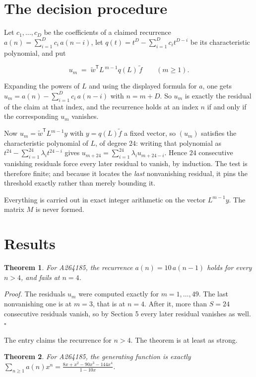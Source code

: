 \documentclass[11pt]{article}
\newtheorem{theorem}{Theorem}
\theoremstyle{definition}
\begin{document}
\section{The decision procedure}

Let $c_1,\dots,c_D$ be the coefficients of a claimed recurrence $a(n) = \sum_{i=1}^{D} c_i\,a(n-i)$, let $q(t) = t^{D} - \sum_{i=1}^{D} c_i t^{D-i}$ be its characteristic polynomial, and put

\[u_m \;=\; \tilde w^{\mathsf T} L^{\,m-1} q(L)\,\tilde f \qquad (m \ge 1).\]

Expanding the powers of $L$ and using the displayed formula for $a$, one gets $u_m = a(n) - \sum_{i=1}^{D} c_i\,a(n-i)$ with $n = m + D$. So $u_m$ is exactly the residual of the claim at that index, and the recurrence holds at an index $n$ if and only if the corresponding $u_m$ vanishes.

Now $u_m = \tilde w^{\mathsf T} L^{m-1} y$ with $y = q(L)\tilde f$ a fixed vector, so $(u_m)$ satisfies the characteristic polynomial of $L$, of degree $24$: writing that polynomial as $t^{24} - \sum_{i=1}^{24} \lambda_i t^{24-i}$ gives $u_{m+24} = \sum_{i=1}^{24} \lambda_i u_{m+24-i}$. Hence $24$ consecutive vanishing residuals force every later residual to vanish, by induction. The test is therefore finite; and because it locates the {\itshape last} nonvanishing residual, it pins the threshold exactly rather than merely bounding it.

Everything is carried out in exact integer arithmetic on the vector $L^{m-1}y$. The matrix $M$ is never formed.

\section{Results}

\begin{theorem} For A264185, the recurrence $a(n) = 10\,a(n-1)$ holds for every $n > 4$, and fails at $n = 4$.\end{theorem}

{\itshape Proof.} The residuals $u_m$ were computed exactly for $m = 1,\dots,49$. The last nonvanishing one is at $m = 3$, that is at $n = 4$. After it, more than $S = 24$ consecutive residuals vanish, so by Section 5 every later residual vanishes as well. $\square$

The entry claims the recurrence for $n > 4$. The theorem is at least as strong.

\begin{theorem} For A264185, the generating function is exactly $\sum_{n\ge 1} a(n)x^n = \frac{8x + x^{2} - 90x^{3} - 144x^{4}}{1 - 10x}$.\end{theorem}
\end{document}
